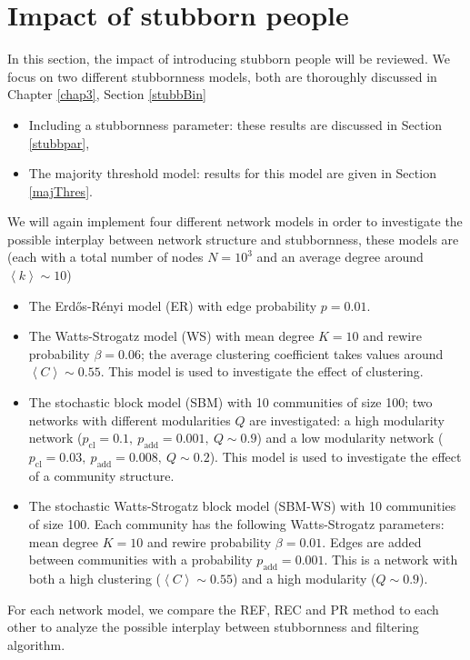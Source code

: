\documentclass[11 pt , letterpaper , twoside , openright]{book}
\begin{document}
\section{Impact of stubborn people}
In this section, the impact of introducing stubborn people will be reviewed. We focus on two different stubbornness models, both are thoroughly discussed in Chapter \ref{chap3}, Section \ref{stubbBin}
\begin{itemize}
	\item Including a stubbornness parameter: these results are discussed in Section \ref{stubbpar},
	\item The majority threshold model: results for this model are given in Section \ref{majThres}.
\end{itemize}
We will again implement four different network models in order to investigate the possible interplay between network structure and stubbornness, these models are (each with a total number of nodes $N = 10^3$ and an average degree around $\left<k\right> \sim 10$)
\begin{itemize}
	\item The Erd\H{o}s-R\'{e}nyi model (ER) with edge probability $p = 0.01$.
	\item The Watts-Strogatz model (WS) with mean degree $K=10$ and rewire probability $\beta = 0.06$; the average clustering coefficient takes values around $\left<C\right> \sim 0.55$. This model is used to investigate the effect of clustering.
	\item The stochastic block model (SBM) with 10 communities of size 100; two networks with different modularities $Q$ are investigated: a high modularity network ($p_{\text{cl}} = 0.1,\ p_{\text{add}} = 0.001,\ Q \sim 0.9$) and a low modularity network ($p_{\text{cl}} = 0.03,\ p_{\text{add}} = 0.008,\ Q \sim 0.2$). This model is used to investigate the effect of a community structure.
	\item The stochastic Watts-Strogatz block model (SBM-WS) with 10 communities of size 100. Each community has the following Watts-Strogatz parameters: mean degree $K =10$ and rewire probability $\beta = 0.01$. Edges are added between communities with a probability $p_{\text{add}} = 0.001$. This is a network with both a high clustering ($\left<C\right> \sim 0.55$) and a high modularity ($Q \sim 0.9$).
\end{itemize}
For each network model, we compare the REF, REC and PR method to each other to analyze the possible interplay between stubbornness and filtering algorithm.
\end{document}
